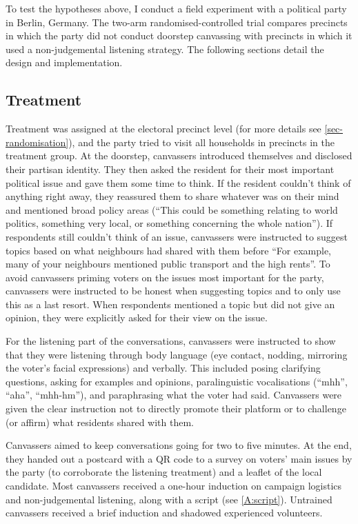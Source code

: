 \documentclass[11pt,a4paper]{scrartcl}
\begin{document}
To test the hypotheses above, I conduct a field experiment with a political party in Berlin, Germany. The two-arm randomised-controlled trial compares precincts in which the party did not conduct doorstep canvassing with precincts in which it used a non-judgemental listening strategy. The following sections detail the design and implementation.

\subsection{Treatment}

Treatment was assigned at the electoral precinct level (for more details see \autoref{sec-randomisation}), and the party tried to visit all households in precincts in the treatment group. At the doorstep, canvassers introduced themselves and disclosed their partisan identity. They then asked the resident for their most important political issue and gave them some time to think. If the resident couldn't think of anything right away, they reassured them to share whatever was on their mind and mentioned broad policy areas (\enquote{This could be something relating to world politics, something very local, or something concerning the whole nation}). If respondents still couldn't think of an issue, canvassers were instructed to suggest topics based on what neighbours had shared with them before \enquote{For example, many of your neighbours mentioned public transport  and the high rents}. To avoid canvassers priming voters on the issues most important for the party, canvassers were instructed to be honest when suggesting topics and to only use this as a last resort. When respondents mentioned a topic but did not give an opinion, they were explicitly asked for their view on the issue.

For the listening part of the conversations, canvassers were instructed to show that they were listening through body language (eye contact, nodding, mirroring the voter's facial expressions) and verbally. This included posing clarifying questions, asking for examples and opinions, paralinguistic vocalisations (\enquote{mhh}, \enquote{aha}, \enquote{mhh-hm}), and paraphrasing what the voter had said. Canvassers were given the clear instruction not to directly promote their platform or to challenge (or affirm) what residents shared with them.

Canvassers aimed to keep conversations going for two to five minutes. At the end, they handed out a postcard with a QR code to a survey on voters’ main issues by the party (to corroborate the listening treatment) and a leaflet of the local candidate. Most canvassers received a one-hour induction on campaign logistics and non-judgemental listening, along with a script (see \autoref{A:script}). Untrained canvassers received a brief induction and shadowed experienced volunteers.
\end{document}

